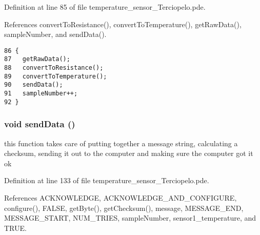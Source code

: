 Definition at line 85 of file temperature\_\-sensor\_\-Terciopelo.pde.

References convertToResistance(), convertToTemperature(), getRawData(), sampleNumber, and sendData().

\begin{Code}\begin{verbatim}86 {
87   getRawData();
88   convertToResistance();
89   convertToTemperature();
90   sendData();
91   sampleNumber++;
92 }
\end{verbatim}
\end{Code}


\hypertarget{applet_2temperature__sensor___terciopelo_8pde_95b1b253ee46df6a93285803cf1f3370}{
\subsubsection[{sendData}]{\setlength{\rightskip}{0pt plus 5cm}void sendData ()}}
\label{applet_2temperature__sensor___terciopelo_8pde_95b1b253ee46df6a93285803cf1f3370}


this function takes care of putting together a message string, calculating a checksum, sending it out to the computer and making sure the computer got it ok 



Definition at line 133 of file temperature\_\-sensor\_\-Terciopelo.pde.

References ACKNOWLEDGE, ACKNOWLEDGE\_\-AND\_\-CONFIGURE, configure(), FALSE, getByte(), getChecksum(), message, MESSAGE\_\-END, MESSAGE\_\-START, NUM\_\-TRIES, sampleNumber, sensor1\_\-temperature, and TRUE.

